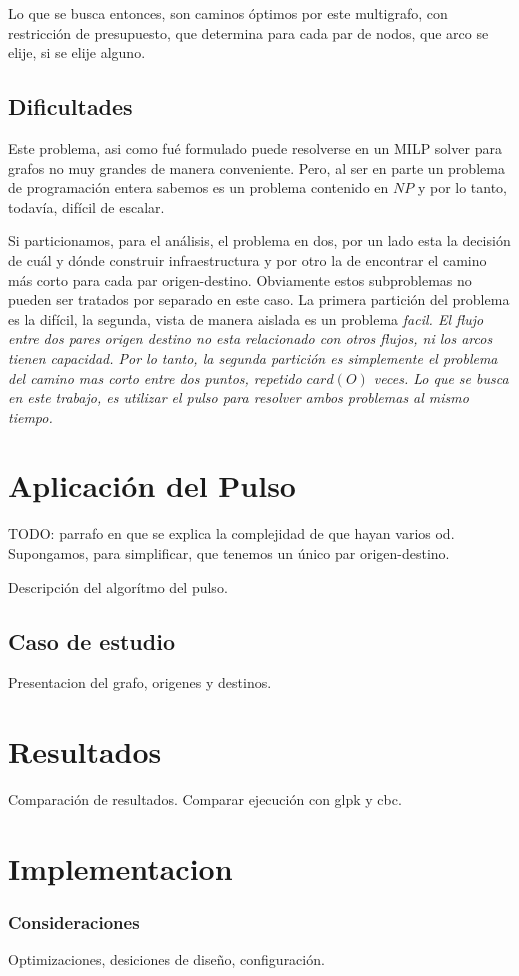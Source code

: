 \documentclass{article}
\begin{document}
  Lo que se busca entonces, son caminos óptimos por este multigrafo, con restricción de presupuesto, que determina para cada par de nodos, que arco se elije, si se elije alguno.

  \subsection*{Dificultades}

  Este problema, asi como fué formulado puede resolverse en un MILP solver para grafos no muy grandes de manera conveniente. Pero, al ser en parte un problema de programación entera sabemos es un problema contenido en $NP$ y por lo tanto, todavía, difícil de escalar.

  Si particionamos, para el análisis, el problema en dos, por un lado esta la decisión de cuál y dónde construir infraestructura y por otro la de encontrar el camino más corto para cada par origen-destino. Obviamente estos subproblemas no pueden ser tratados por separado en este caso. La primera partición del problema es la difícil, la segunda, vista de manera aislada es un problema \it{facil}. El flujo entre dos pares origen destino no esta relacionado con otros flujos, ni los arcos tienen capacidad. Por lo tanto, la segunda partición es simplemente el problema del camino mas corto entre dos puntos, repetido $card(O)$ veces. Lo que se busca en este trabajo, es utilizar el pulso para resolver ambos problemas al mismo tiempo.

  \section*{Aplicación del Pulso}



  TODO: parrafo en que se explica la complejidad de que hayan varios od.
  Supongamos, para simplificar, que tenemos un único par origen-destino.
  

  Descripción del algorítmo del pulso.

  \subsection*{Caso de estudio}

  Presentacion del grafo, origenes y destinos.

  \section*{Resultados}

  Comparación de resultados.
  Comparar ejecución con glpk y cbc.

  \section*{Implementacion}

  \subsubsection*{Consideraciones}

  Optimizaciones, desiciones de diseño, configuración.
\end{document}
